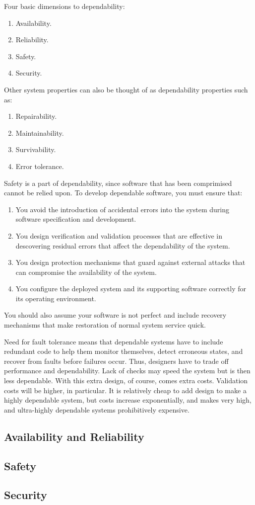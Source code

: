 \documentclass{article}
\begin{document}
Four basic dimensions to dependability:
\begin{enumerate}
    \item Availability.
    \item Reliability.
    \item Safety.
    \item Security.
\end{enumerate}
Other system properties can also be thought of as dependability properties such as:
\begin{enumerate}
    \item Repairability.
    \item Maintainability.
    \item Survivability.
    \item Error tolerance.
\end{enumerate}
Safety is a part of dependability, since software that has been comprimised cannot be relied upon.  To develop dependable software, you must ensure that:
\begin{enumerate}
    \item You avoid the introduction of accidental errors into the system during software specification and development.
    \item You design verification and validation processes that are effective in descovering residual errors that affect the dependability of the system.
    \item You design protection mechanisms that guard against external attacks that can compromise the availability of the system.
    \item You configure the deployed system and its supporting software correctly for its operating environment.
\end{enumerate}
You should also assume your software is not perfect and include recovery mechanisms that make restoration of normal system service quick.

Need for fault tolerance means that dependable systems have to include redundant code to help them monitor themselves, detect erroneous states, and recover from faults before failures occur.  Thus, designers have to trade off performance and dependability.  Lack of checks may speed the system but is then less dependable.
With this extra design, of course, comes extra costs.  Validation costs will be higher, in particular.
It is relatively cheap to add design to make a highly dependable system, but costs increase exponentially, and makes very high, and ultra-highly dependable systems prohibitively expensive.

\subsection{Availability and Reliability}
\subsection{Safety}
\subsection{Security}
\end{document}
